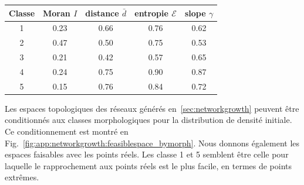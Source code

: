 \begin{table}
\begin{tabular}{|c|c|c|c|c|}
\hline
Classe & Moran $I$ & distance $\bar{d}$ & entropie $\mathcal{E}$ & slope $\gamma$ \\\hline 
1 & 0.23 & 0.66 & 0.76 & 0.62 \\\hline %
2 & 0.47 & 0.50 & 0.75 & 0.53 \\\hline %
3 & 0.21 & 0.42 & 0.57 & 0.65 \\\hline %
4 & 0.24 & 0.75 & 0.90 & 0.87 \\\hline %
5 & 0.15 & 0.76 & 0.84 & 0.72 \\\hline %
\end{tabular}
\end{table}


Les espaces topologiques des réseaux générés en~\ref{sec:networkgrowth} peuvent être conditionnés aux classes morphologiques pour la distribution de densité initiale. Ce conditionnement est montré en Fig.~\ref{fig:app:networkgrowth:feasiblespace_bymorph}. Nous donnons également les espaces faisables avec les points réels. Les classe 1 et 5 semblent être celle pour laquelle le rapprochement aux points réels est le plus facile, en termes de points extrêmes.


